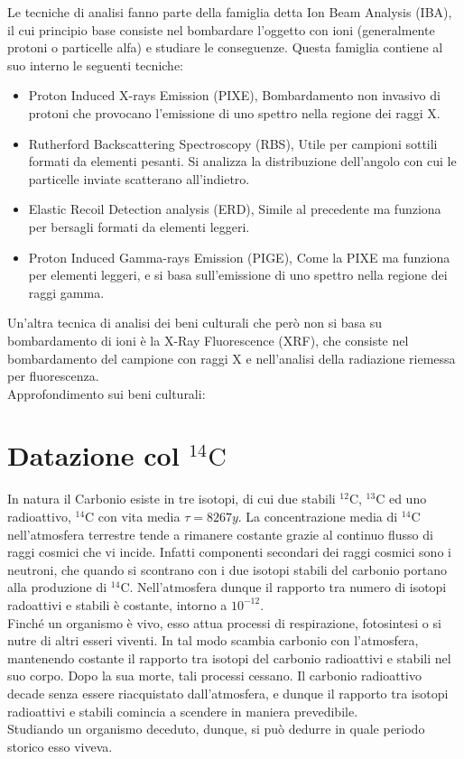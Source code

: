 Le tecniche di analisi fanno parte della famiglia detta Ion Beam Analysis (IBA), il cui principio base consiste nel bombardare l'oggetto con ioni (generalmente protoni o particelle alfa) e studiare le conseguenze. Questa famiglia contiene al suo interno le seguenti tecniche:
\begin{itemize}
\item Proton Induced X-rays Emission (PIXE), Bombardamento non invasivo di protoni che provocano l'emissione di uno spettro nella regione dei raggi X.
\item Rutherford Backscattering Spectroscopy (RBS), Utile per campioni sottili formati da elementi pesanti. Si analizza la distribuzione dell'angolo con cui le particelle inviate scatterano all'indietro.
\item Elastic Recoil Detection analysis (ERD), Simile al precedente ma funziona per bersagli formati da elementi leggeri.
\item Proton Induced Gamma-rays Emission (PIGE), Come la PIXE ma funziona per elementi leggeri, e si basa sull'emissione di uno spettro nella regione dei raggi gamma.
\end{itemize}

Un'altra tecnica di analisi dei beni culturali che però non si basa su bombardamento di ioni è la X-Ray Fluorescence (XRF), che consiste nel bombardamento del campione con raggi X e nell'analisi della radiazione riemessa per fluorescenza.\\

Approfondimento sui beni culturali: \cite{Cultural}


\section{Datazione col $^{14}\text{C}$}

In natura il Carbonio esiste in tre isotopi, di cui due stabili $^{12}\text{C}$, $^{13}\text{C}$ ed uno radioattivo, $^{14}\text{C}$ con vita media $\tau=8267y$.
La concentrazione media di $^{14}\text{C}$ nell'atmosfera terrestre tende a rimanere costante grazie al continuo flusso di raggi cosmici che vi incide. Infatti  componenti secondari dei raggi cosmici sono i neutroni, che quando si scontrano con i due isotopi stabili del carbonio portano alla produzione di $^{14}\text{C}$.
Nell'atmosfera dunque il rapporto tra numero di isotopi radoattivi e stabili è costante, intorno a $10^{-12}$. \\
Finché un organismo è vivo, esso attua processi di respirazione, fotosintesi o si nutre di altri esseri viventi. In tal modo scambia carbonio con l'atmosfera, mantenendo costante il rapporto tra isotopi del carbonio radioattivi e stabili nel suo corpo. Dopo la sua morte, tali processi cessano. Il carbonio radioattivo decade senza essere riacquistato dall'atmosfera, e dunque il rapporto tra isotopi radioattivi e stabili comincia a scendere in maniera prevedibile.\\
Studiando un organismo deceduto, dunque, si può dedurre in quale periodo storico esso viveva.

